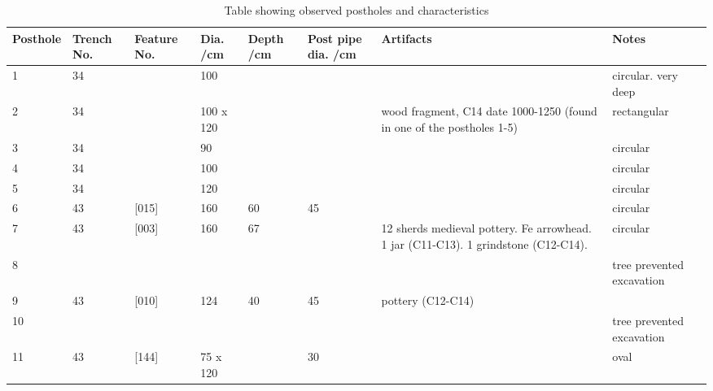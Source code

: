 \documentclass[letterpaper,11pt,titlepage]{article}
\begin{document}
{\begin{table}[]
	\small
	\centering
	\caption{Table showing observed postholes and characteristics}
	\label{characteristics}
	\begin{tabular}{|p{1.25cm}|p{1.25cm}|p{1.25cm}|p{1cm}|p{1cm}|p{1.5cm}|p{4.5cm}|p{4cm}|}
		\toprule
Posthole & Trench No. & Feature No. & Dia. /cm & Depth /cm & Post pipe dia. /cm & Artifacts & Notes \\
		\midrule
1  & 34 &       & 100       &    &    &                                                                                    & circular. very deep              \\ \hline
2  & 34 &       & 100 x 120 &    &    & wood fragment, C14 date 1000-1250 (found in one of the postholes 1-5)           & rectangular                      \\ \hline
3  & 34 &       & 90        &    &    &                                                                                    & circular                         \\ \hline
4  & 34 &       & 100       &    &    &                                                                                    & circular                         \\ \hline
5  & 34 &       & 120       &    &    &                                                                                    & circular                         \\ \hline
6  & 43 & [015] & 160       & 60 & 45 &                                                                                    & circular                         \\ \hline
7  & 43 & [003] & 160       & 67 &    & 12 sherds medieval pottery. Fe arrowhead. 1 jar (C11-C13). 1 grindstone (C12-C14). & circular                         \\ \hline
8  &    &       &           &    &    &                                                                                    & tree prevented excavation        \\ \hline
9  & 43 & [010] & 124       & 40 & 45 & pottery (C12-C14)                                                                  &                                  \\ \hline
10 &    &       &           &    &    &                                                                                    & tree prevented excavation        \\ \hline
11 & 43 & [144] & 75 x 120  &    & 30 &                                                                                    & oval                             \\ \hline

\end{tabular}
\end{table}}
\end{document}
